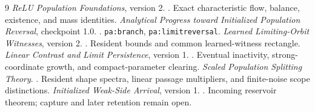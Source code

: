 \documentclass[11pt]{article}
\numberwithin{equation}{section}
\theoremstyle{remark}\newtheorem{remark}[theorem]{Remark}
\begin{document}
\begin{thebibliography}{9}
 \emph{ReLU Population Foundations}, version 2.
. Exact characteristic flow,
balance, existence, and mass identities.
 \emph{Analytical Progress toward Initialized Population
Reversal}, checkpoint 1.0. .
\texttt{pa:branch}, \texttt{pa:limitreversal}.
 \emph{Learned Limiting-Orbit Witnesses}, version 2.
. Resident bounds and common
learned-witness rectangle.
 \emph{Linear Contrast and Limit Persistence}, version 1.
. Eventual inactivity,
strong-coordinate growth, and compact-parameter clearing.
 \emph{Scaled Population Splitting Theory}.
. Resident shape spectra,
linear passage multipliers, and finite-noise scope distinctions.
 \emph{Initialized Weak-Side Arrival}, version 1.
. Incoming reservoir theorem;
capture and later retention remain open.
\end{thebibliography}
\end{document}
